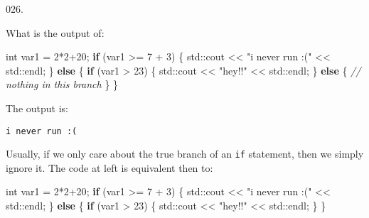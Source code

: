 \documentclass[]{book}
\newenvironment{Shaded}{}{}
\newcommand{\BuiltInTok}[1]{#1}
\newcommand{\CommentTok}[1]{\textcolor[rgb]{0.38,0.63,0.69}{\textit{#1}}}
\newcommand{\ControlFlowTok}[1]{\textcolor[rgb]{0.00,0.44,0.13}{\textbf{#1}}}
\newcommand{\DataTypeTok}[1]{\textcolor[rgb]{0.56,0.13,0.00}{#1}}
\newcommand{\DecValTok}[1]{\textcolor[rgb]{0.25,0.63,0.44}{#1}}
\newcommand{\NormalTok}[1]{#1}
\newcommand{\StringTok}[1]{\textcolor[rgb]{0.25,0.44,0.63}{#1}}
\begin{document}
\begin{minipage}{\linewidth}\noindent
{\tiny 026.}\\
\begin{minipage}[t]{.485\linewidth}

What is the output of:

\begin{framed}

\begin{Shaded}
\begin{Highlighting}[]
\DataTypeTok{int}\NormalTok{ var1 = }\DecValTok{2}\NormalTok{*}\DecValTok{2+20}\NormalTok{;}
\ControlFlowTok{if}\NormalTok{ (var1 >= }\DecValTok{7}\NormalTok{ + }\DecValTok{3}\NormalTok{) \{}
  \BuiltInTok{std::}\NormalTok{cout << }\StringTok{"i never run :("}\NormalTok{ << }\BuiltInTok{std::}\NormalTok{endl;}
\NormalTok{\} }\ControlFlowTok{else}\NormalTok{ \{}
  \ControlFlowTok{if}\NormalTok{ (var1 > }\DecValTok{23}\NormalTok{) \{}
    \BuiltInTok{std::}\NormalTok{cout << }\StringTok{"hey!!"}\NormalTok{ << }\BuiltInTok{std::}\NormalTok{endl;}
\NormalTok{  \} }\ControlFlowTok{else}\NormalTok{ \{}
    \CommentTok{// nothing in this branch}
\NormalTok{  \}}
\NormalTok{\}}
\end{Highlighting}
\end{Shaded}

\end{framed}

\end{minipage}
\hfill
\begin{minipage}[t]{.485\linewidth}

The output is:

\begin{framed}

\begin{verbatim}
i never run :(
\end{verbatim}

\end{framed}

Usually, if we only care about the true branch of an \texttt{if}
statement, then we simply ignore it. The code at left is equivalent then
to:

\begin{framed}

\begin{Shaded}
\begin{Highlighting}[]
\DataTypeTok{int}\NormalTok{ var1 = }\DecValTok{2}\NormalTok{*}\DecValTok{2+20}\NormalTok{;}
\ControlFlowTok{if}\NormalTok{ (var1 >= }\DecValTok{7}\NormalTok{ + }\DecValTok{3}\NormalTok{) \{}
  \BuiltInTok{std::}\NormalTok{cout << }\StringTok{"i never run :("}\NormalTok{ << }\BuiltInTok{std::}\NormalTok{endl;}
\NormalTok{\} }\ControlFlowTok{else}\NormalTok{ \{}
  \ControlFlowTok{if}\NormalTok{ (var1 > }\DecValTok{23}\NormalTok{) \{}
    \BuiltInTok{std::}\NormalTok{cout << }\StringTok{"hey!!"}\NormalTok{ << }\BuiltInTok{std::}\NormalTok{endl;}
\NormalTok{  \}}
\NormalTok{\}}
\end{Highlighting}
\end{Shaded}


\end{framed}
\end{minipage}
\end{minipage}
\end{document}
